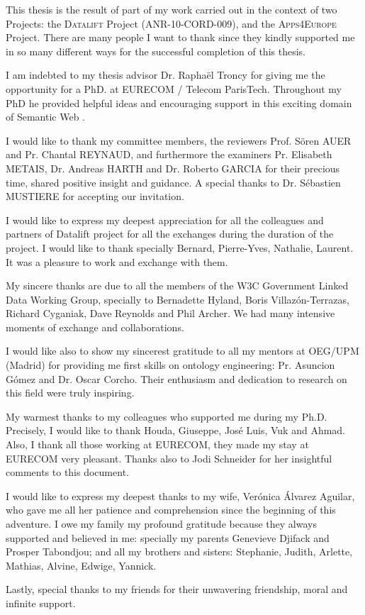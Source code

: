 This thesis is the result of part of my work carried out in the context of two Projects: the \textsc{Datalift} Project (ANR-10-CORD-009), and the \textsc{Apps4Europe} Project. There are many people I want to thank since they kindly supported me in so many different ways for the successful completion of this thesis.

I am indebted to my thesis advisor Dr. Rapha\"{e}l Troncy for giving me the opportunity for a PhD. at EURECOM / Telecom ParisTech. Throughout my PhD  he provided helpful ideas and encouraging support in this exciting domain of Semantic Web .

I would like to thank my committee members, the reviewers Prof. S\"{o}ren AUER  and Pr. Chantal REYNAUD, and furthermore the examiners Pr. Elisabeth METAIS, Dr. Andreas HARTH  and Dr. Roberto GARCIA for their precious time, shared positive insight and guidance. A special thanks to Dr. S\'{e}bastien MUSTIERE for accepting our invitation.

I would like to express my deepest appreciation for all the colleagues and partners of Datalift project for all the exchanges during the duration of the project. I would like to thank specially Bernard, Pierre-Yves, Nathalie, Laurent. It was a pleasure to work and exchange with them.

My sincere thanks are due to all the members of the W3C Government Linked Data Working Group, specially to Bernadette Hyland, Boris Villaz\'{o}n-Terrazas, Richard Cyganiak, Dave Reynolds and Phil Archer. We had many intensive moments of exchange and collaborations.

I would like also to show my sincerest gratitude to all my mentors at OEG/UPM (Madrid) for providing me first skills on ontology engineering: Pr. Asuncion G\'{o}mez and Dr. Oscar Corcho. Their enthusiasm and dedication to research on this field were truly inspiring.

My warmest thanks to my colleagues who supported me during my Ph.D. Precisely, I would like to thank Houda, Giuseppe, Jos\'{e} Luis, Vuk and Ahmad. Also, I thank all those working at EURECOM, they made my stay at EURECOM very pleasant. Thanks also to Jodi Schneider for her insightful comments to this document.

I would like to express my deepest thanks to my wife, Ver\'{o}nica \'{A}lvarez Aguilar, who gave me all her patience and comprehension since the beginning of this adventure. I owe my family my profound gratitude because they always supported and believed in me: specially my parents Genevieve Djifack and Prosper Tabondjou; and all my brothers and sisters: Stephanie, Judith, Arlette, Mathias, Alvine, Edwige, Yannick.

Lastly, special thanks to my friends for their unwavering friendship, moral and infinite support.

